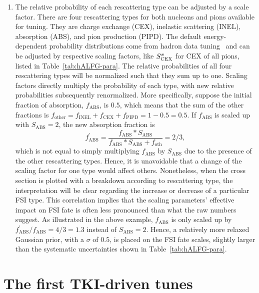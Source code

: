 \begin{enumerate}
    \item 
    The relative probability of each rescattering type can be adjusted by a scale factor. There are four rescattering types for both nucleons and pions available for tuning. They are charge exchange (CEX), inelastic scattering (INEL), absorption (ABS), and pion production (PIPD). The default energy-dependent probability distributions come from hadron data tuning~\cite{LADS:1999dyv,Navon:1983xj,Carroll:1976hj,Clough:1974qt,BAUHOFF1986429} and can be adjusted by respective scaling factors, like $S_\textrm{CEX}^{\pi}$ for CEX of all pions, listed in Table~\ref{tab:hALFG-para}. The relative probabilities of all four rescattering types will be normalized such that they sum up to one. Scaling factors directly multiply  the probability of each type, with new relative probabilities subsequently renormalized. More specifically, suppose the initial fraction of absorption, $f_\textrm{ABS}$, is $0.5$, which means that the sum of the other fractions is  $f_\textrm{other}=f_\textrm{INEL}+f_\textrm{CEX}+f_\textrm{PIPD}=1-0.5=0.5$. If $f_\textrm{ABS}$ is scaled up with $S_\textrm{ABS}=2$, the new absorption fraction is 
    \begin{equation}
        f^\prime_\textrm{ABS} = \frac{f_\textrm{ABS}*S_\textrm{ABS}}{f_\textrm{ABS}*S_\textrm{ABS}+f_\textrm{oth}} = 2/3,
    \end{equation}
    which is not equal to simply multiplying $f_\textrm{ABS}$ by $S_\textrm{ABS}$ due to the presence of the other rescattering types. Hence, it is unavoidable that a change of the scaling factor for one type would affect others. Nonetheless, when the cross section is plotted with a breakdown according to rescattering type, the interpretation will be clear regarding the increase or decrease of a particular FSI type. This correlation implies that the scaling parameters' effective impact on FSI fate is often less pronounced than what the raw numbers suggest. As illustrated in the above example, $f_\textrm{ABS}$ is only scaled up by $ f^\prime_\textrm{ABS}/f_\textrm{ABS}=4/3=1.3$ instead of $S_\textrm{ABS}=2$. Hence, a relatively more relaxed Gaussian prior, with a $\sigma$ of $0.5$, is placed on the FSI fate scales, slightly larger than the systematic uncertainties shown in Table~\ref{tab:hALFG-para}. 
\end{enumerate}


\section{\label{sec:results}The first TKI-driven \genie tunes}

